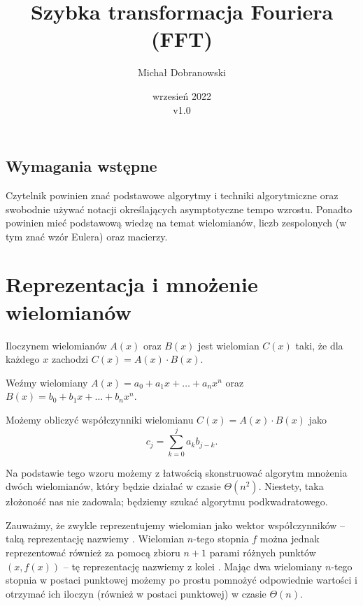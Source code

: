 \documentclass[11pt]{scrartcl}
\title{Szybka transformacja Fouriera (FFT)}
\author{Michał Dobranowski}
\date{wrzesień 2022 \\ v1.0}
\begin{document}
    \maketitle
    \subsection*{Wymagania wstępne}
    Czytelnik powinien znać podstawowe algorytmy i techniki algorytmiczne oraz swobodnie używać notacji określających asymptotyczne tempo wzrostu. Ponadto powinien mieć podstawową wiedzę na temat wielomianów, liczb zespolonych (w tym znać wzór Eulera) oraz macierzy.
    \tableofcontents
    \eject

\section{Reprezentacja i mnożenie wielomianów}
    \begin{definition}
        Iloczynem wielomianów $A(x)$ oraz $B(x)$ jest wielomian $C(x)$ taki, że dla każdego $x$ zachodzi $C(x) = A(x)\cdot B(x)$.
    \end{definition}

    Weźmy wielomiany $A(x) = a_0 + a_1x + \ldots + a_nx^n$ oraz $B(x) = b_0 + b_1x + \ldots + b_nx^n$.
    \begin{fact}
        Możemy obliczyć współczynniki wielomianu $C(x) = A(x) \cdot B(x)$ jako
        $$ c_j = \sum_{k = 0}^j a_kb_{j-k}. $$
    \end{fact}
    Na podstawie tego wzoru możemy z łatwością skonstruować algorytm mnożenia dwóch wielomianów, który będzie działać w czasie $\Theta(n^2)$. Niestety, taka złożoność nas nie zadowala; będziemy szukać algorytmu podkwadratowego.

    Zauważmy, że zwykle reprezentujemy wielomian jako wektor współczynników -- taką reprezentację nazwiemy . Wielomian $n$-tego stopnia $f$ można jednak reprezentować również za pomocą zbioru $n + 1$ parami różnych punktów $(x, f(x))$ -- tę reprezentację nazwiemy z kolei . Mając dwa wielomiany $n$-tego stopnia w postaci punktowej możemy po prostu pomnożyć odpowiednie wartości i otrzymać ich iloczyn (również w postaci punktowej) w czasie $\Theta(n)$.
\end{document}
